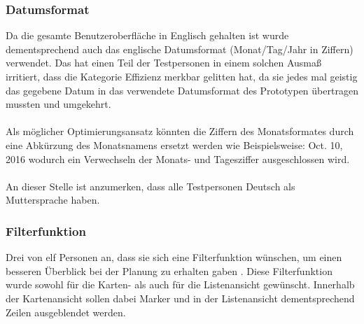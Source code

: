 \documentclass[Bachelorarbeit.tex]{subfiles}
\begin{document}
\subsubsection*{Datumsformat}
Da die gesamte Benutzeroberfläche in Englisch gehalten ist wurde dementsprechend auch das englische Datumsformat (Monat/Tag/Jahr in Ziffern) verwendet. 
Das hat einen Teil der Testpersonen in einem solchen Ausmaß irritiert, dass die Kategorie Effizienz merkbar gelitten hat, da sie jedes mal geistig das gegebene Datum in das verwendete Datumsformat des Prototypen übertragen mussten und umgekehrt.\\
\\
Als möglicher Optimierungsansatz könnten die Ziffern des Monatsformates durch eine Abkürzung des Monatsnamens ersetzt werden wie Beispielsweise: Oct. 10, 2016 wodurch ein Verwechseln der Monats- und Tagesziffer ausgeschlossen wird.  
\\
\\
An dieser Stelle ist anzumerken, dass alle Testpersonen Deutsch als Muttersprache haben.

\subsubsection*{Filterfunktion}
Drei von elf Personen an, dass sie sich eine Filterfunktion wünschen, um einen besseren Überblick bei der Planung zu erhalten gaben .  
Diese Filterfunktion wurde sowohl für die Karten- als auch für die Listenansicht gewünscht.
Innerhalb der Kartenansicht sollen dabei Marker und in der Listenansicht dementsprechend Zeilen ausgeblendet werden.
 
\end{document}
